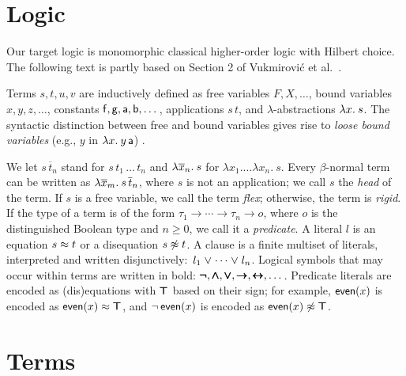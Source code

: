 \kern-1pt %

\section{Logic} %
\label{sec:logic}

Our target logic is monomorphic classical higher-order logic with Hilbert choice.
The following text is partly based on Section 2 of Vukmirovi\'c et al.~\cite{section-making-ho-work}.

Terms $s, t, u, v$ are inductively defined as free variables $F, X, \ldots$, bound variables $x,
y, z, \dotsc$, constants $\mathsf{f}, \mathsf{g},\allowbreak \mathsf{a},\allowbreak \mathsf{b},
\dotsc$, applications $s \, t$, and $\lambda$-abstractions $\lambda x.\> s$.
The syntactic distinction between free and bound variables
gives rise to \emph{loose bound variables} (e.g., $y$ in $\lambda x.\> y \, \mathsf{a}$)
\cite{tn-93-patterns}.

We let $s \, \overline{t}_n$ stand for $s \, t_1 \, \ldots \, t_n$ and
$\lambda \overline{x}_n.\> s$ for $\lambda x_1. \ldots \lambda x_n. \> s$.
Every $\beta$-normal term can be written as $\lambda \overline{x}_m.\> s \,
\overline{t}_n$, where $s$ is not an application; we call $s$ the \emph{head}
of the term. If $s$ is a free variable, we call the term \emph{flex};
otherwise, the term is \emph{rigid}. If the type of a term is of the form $\tau_1 \to \cdots \to
\tau_n \to o$, where $o$ is the distinguished Boolean type and $n \ge 0$, we
call it a \emph{predicate}. A literal $l$ is an equation $s \approx t$ or
a disequation $s \not\approx t$. A clause is a finite multiset of literals,
interpreted and written disjunctively:\ $l_1 \mathrel\lor \cdots \mathrel\lor l_n$.
Logical symbols that may occur within terms are written in bold:
$\pmb{\neg}, \pmb\land, \pmb\lor, \pmb\rightarrow, \pmb\leftrightarrow, \dots$. Predicate
literals are encoded as (dis)equations with $\pmb\top$ based on their sign; for
example, $\mathsf{even}(x)$ is encoded as $\mathsf{even}(x) \approx \pmb\top$, and
$\neg\,\mathsf{even}(x)$ is encoded as $\mathsf{even}(x) \not\approx \pmb\top$.

\section{Terms}
\label{sec:terms}

